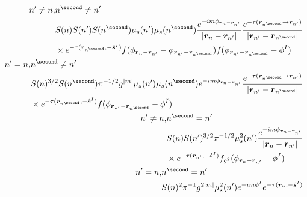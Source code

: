 \documentclass [10pt,letterpaper]{article}
\renewcommand{\vec}{\vectorsym}
\newcommand{\unitvec}[1]{\hat{\vec{#1}}}
\begin{document}
\begin{subequations} \label{eq:result-Vtnm-1pt-components}
	\begin{align}
		\begin{split} \label{eq:result-Vtnm-1pt-np-n-npp-np}
			n^\prime \neq n
			,&
			n^\second \neq n^\prime
			\\
			&
			S(n)S(n^\prime)S(n^\second)
			\mu_s(n^\prime)
			\mu_s(n^\second) 
			\frac
			{e^{-i m \phi_{\vec{r}_n-\vec{r}_{n^\prime}}}}
			{\lvert \vec{r}_n - \vec{r}_{n^\prime} \rvert}
			\frac
			{e^{-\tau(\vec{r}_{n^\second} \to \vec{r}_{n^\prime})} }
			{\lvert \vec{r}_{n^\prime} - \vec{r}_{n^\second} \rvert}
			\\
			&
			\times
			e^{-\tau(\vec{r}_{n^\second},-\unitvec{s}^I)}
			f(
			\phi_{\vec{r}_n-\vec{r}_{n^\prime}}
			-
			\phi_{\vec{r}_{n^\prime}-\vec{r}_{n^\second}}
			)
			f(
			\phi_{\vec{r}_{n^\prime}-\vec{r}_{n^\second}}
			-
			\phi^I
			)
		\end{split}
		\\
		\begin{split} \label{eq:result-Vtnm-1pt-npn-npp-np}
			n^\prime = n
			,&
			n^\second \neq n^\prime
			\\
			&
			S(n)^{3/2}
			S(n^\second)
			\pi^{-1/2}
			g^{\lvert m \rvert}
			\mu_s(n^\prime)
			\mu_s(n^\second) 
			e^{-i m \phi_{\vec{r}_n-\vec{r}_{n^\prime}}}
			\frac
			{e^{-\tau(\vec{r}_{n^\second} \to \vec{r}_{n^\prime})} }
			{\lvert \vec{r}_{n^\prime} - \vec{r}_{n^\second} \rvert}
			\\
			&
			\times
			e^{-\tau(\vec{r}_{n^\second},-\unitvec{s}^I)}
			f(
			\phi_{\vec{r}_{n^\prime}-\vec{r}_{n^\second}}
			-
			\phi^I
			) 
		\end{split}
		\\
		\begin{split} \label{eq:result-Vtnm-1pt-np-n-nppnp}
			n^\prime \neq n
			,&
			n^\second = n^\prime
			\\
			&
			S(n)
			S(n^\prime)^{3/2}
			\pi^{-1/2}
			\mu_s^2(n^\prime)
			\frac
			{e^{-i m \phi_{\vec{r}_n-\vec{r}_{n^\prime}}}}
			{\lvert \vec{r}_n - \vec{r}_{n^\prime} \rvert}
			\\
			&
			\times
			e^{-\tau(\vec{r}_{n^\prime},-\unitvec{s}^I)}
			f_{g^2}(
			\phi_{\vec{r}_n-\vec{r}_{n^\prime}}
			-
			\phi^I
			)
		\end{split}
		\\
		\begin{split} \label{eq:result-Vtnm-1pt-npn-nppnp}
			n^\prime = n
			,&
			n^\second = n^\prime
			\\
			&
			S(n)^2
			\pi^{-1}
			g^{2 \lvert m \rvert}
			\mu_s^2(n^\prime)
			e^{-i m \phi^I}
			e^{-\tau(\vec{r}_n,-\unitvec{s}^I)}
		\end{split}
	\end{align}
\end{subequations}
\end{document}
